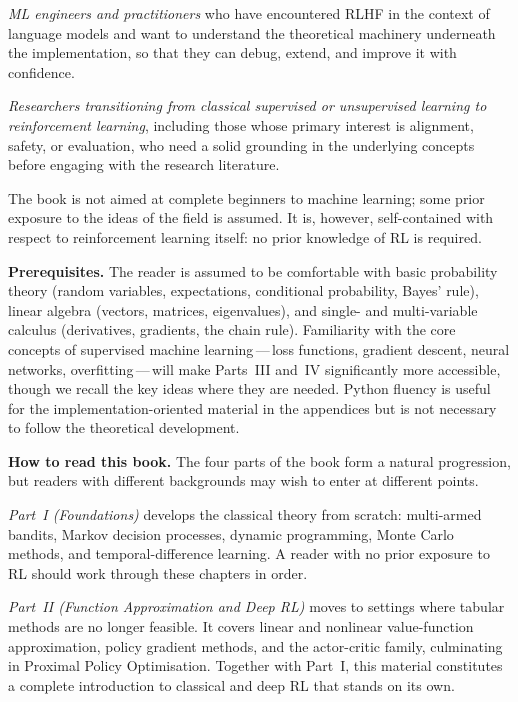 \emph{ML engineers and practitioners} who have encountered RLHF in the context of language
models and want to understand the theoretical machinery underneath the implementation, so
that they can debug, extend, and improve it with confidence.

\emph{Researchers transitioning from classical supervised or unsupervised learning to
reinforcement learning}, including those whose primary interest is alignment, safety, or
evaluation, who need a solid grounding in the underlying concepts before engaging with the
research literature.

The book is not aimed at complete beginners to machine learning; some prior exposure to the
ideas of the field is assumed.  It is, however, self-contained with respect to reinforcement
learning itself: no prior knowledge of RL is required.

\medskip

\textbf{Prerequisites.}\quad
The reader is assumed to be comfortable with basic probability theory (random variables,
expectations, conditional probability, Bayes' rule), linear algebra (vectors, matrices,
eigenvalues), and single- and multi-variable calculus (derivatives, gradients, the chain
rule).  Familiarity with the core concepts of supervised machine learning\,---\,loss
functions, gradient descent, neural networks, overfitting\,---\,will make Parts~III and~IV
significantly more accessible, though we recall the key ideas where they are needed.
Python fluency is useful for the implementation-oriented material in the appendices but is
not necessary to follow the theoretical development.

\medskip

\textbf{How to read this book.}\quad
The four parts of the book form a natural progression, but readers with different backgrounds
may wish to enter at different points.

\emph{Part~I (Foundations)} develops the classical theory from scratch: multi-armed bandits,
Markov decision processes, dynamic programming, Monte Carlo methods, and
temporal-difference learning.  A reader with no prior exposure to RL should work through
these chapters in order.

\emph{Part~II (Function Approximation and Deep RL)} moves to settings where tabular methods
are no longer feasible.  It covers linear and nonlinear value-function approximation, policy
gradient methods, and the actor-critic family, culminating in Proximal Policy Optimisation.
Together with Part~I, this material constitutes a complete introduction to classical and
deep RL that stands on its own.

